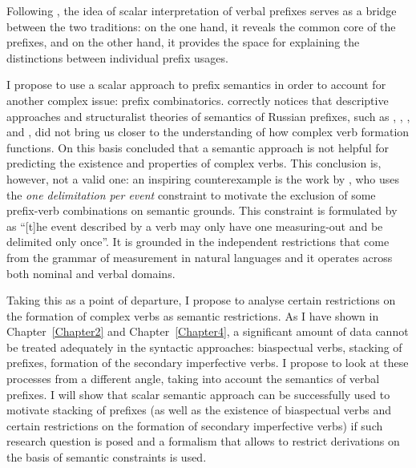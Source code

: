Following \citet{Filip:08}, the idea of scalar interpretation of verbal prefixes serves as a bridge between the two traditions: on the one hand, it reveals the common core of the prefixes, and on the other hand, it provides the space for explaining the distinctions between individual prefix usages. 

I propose to use a scalar approach to prefix semantics in order to account for another complex issue: prefix combinatorics. \citet{Tatevosov:09} correctly notices that descriptive approaches and structuralist theories of semantics of Russian prefixes, such as \citet{Avilova:64}, \citet{Golovin:59}, \citet{Lopatin:97}, and \citet{Tixonov:98}, did not bring us closer to the understanding of how complex verb formation functions. On this basis \citet{Tatevosov:09} concluded that a semantic approach is not helpful for predicting the existence and properties of complex verbs. This conclusion is, however, not a valid one: an inspiring counterexample is the work by \citet{Filip:03}, who uses the \textit{one delimitation per event} constraint to motivate the exclusion of some prefix-verb combinations on semantic grounds. This constraint is formulated by \citet[79]{Tenny:94} as ``[t]he event described by a verb may only have one measuring-out and be delimited only once''. It is grounded in the independent restrictions that come from the grammar of measurement in natural languages and it operates across both nominal and verbal domains. 

Taking this as a point of departure, I propose to analyse certain restrictions on the formation of complex verbs as semantic restrictions. As I have shown in Chapter~\ref{Chapter2} and Chapter~\ref{Chapter4}, a significant amount of data cannot be treated adequately in the syntactic approaches: biaspectual verbs, stacking of prefixes, formation of the secondary imperfective verbs. I propose to look at these processes from a different angle, taking into account the semantics of verbal prefixes. I will show that scalar semantic approach can be successfully used to motivate stacking of prefixes (as well as the existence of biaspectual verbs and certain restrictions on the formation of secondary imperfective verbs) if such research question is posed and a formalism that allows to restrict derivations on the basis of semantic constraints is used. 


